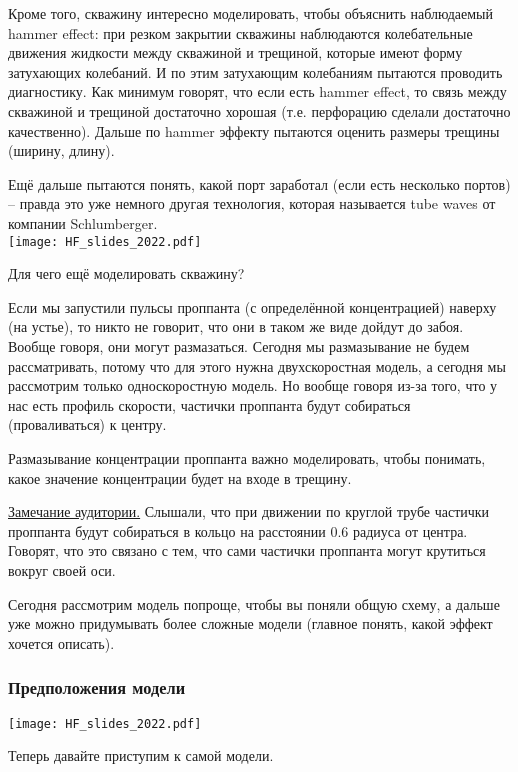 \documentclass[main.tex]{subfiles}
\begin{document}
Кроме того, скважину интересно моделировать, чтобы объяснить наблюдаемый hammer effect: при резком закрытии скважины наблюдаются колебательные движения жидкости между скважиной и трещиной, которые имеют форму затухающих колебаний.
И по этим затухающим колебаниям пытаются проводить диагностику. Как минимум говорят, что если есть hammer effect, то связь между скважиной и трещиной достаточно хорошая (т.е. перфорацию сделали достаточно качественно).
Дальше по hammer эффекту пытаются оценить размеры трещины (ширину, длину).

Ещё дальше пытаются понять, какой порт заработал (если есть несколько портов) -- правда это уже немного другая технология, которая называется tube waves от компании Schlumberger.
\\

\texttt{[image: HF\_slides\_2022.pdf]}

Для чего ещё моделировать скважину?

Если мы запустили пульсы проппанта (с определённой концентрацией) наверху (на устье), то никто не говорит, что они в таком же виде дойдут до забоя.
Вообще говоря, они могут размазаться.
Сегодня мы размазывание не будем рассматривать, потому что для этого нужна двухскоростная модель, а сегодня мы рассмотрим только односкоростную модель.
Но вообще говоря из-за того, что у нас есть профиль скорости, частички проппанта будут собираться (проваливаться) к центру.

Размазывание концентрации проппанта важно моделировать, чтобы понимать, какое значение концентрации будет на входе в трещину.


\underline{Замечание аудитории.}
Слышали, что при движении по круглой трубе частички проппанта будут собираться в кольцо на расстоянии 0.6 радиуса от центра.
Говорят, что это связано с тем, что сами частички проппанта могут крутиться вокруг своей оси.


Сегодня рассмотрим модель попроще, чтобы вы поняли общую схему, а дальше уже можно придумывать более сложные модели (главное понять, какой эффект хочется описать).
\\

\subsubsection{Предположения модели}

\texttt{[image: HF\_slides\_2022.pdf]}

Теперь давайте приступим к самой модели.
\end{document}
